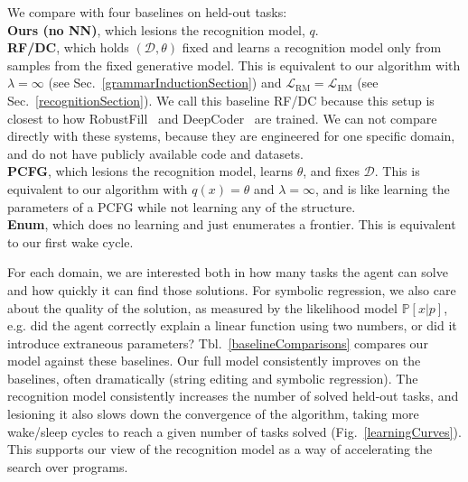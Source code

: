 \documentclass{article}
\newcommand{\probability}{\mathds{P}} %
\begin{document}
We compare  with four baselines on  held-out tasks:
\\\noindent \textbf{Ours (no NN)}, which lesions the recognition model, $q$.
\\\noindent \textbf{RF/DC}, which holds $(\mathcal{D},\theta)$ fixed and learns
a recognition model only from samples from the fixed generative model.
This is equivalent to our algorithm with $\lambda = \infty$ (see Sec.~\ref{grammarInductionSection})
and $\mathcal{L}_{\text{RM}} = \mathcal{L}_{\text{HM}}$ (see Sec.~\ref{recognitionSection}).
We call this baseline RF/DC because
this setup is closest to how RobustFill~\cite{devlin2017robustfill} and DeepCoder~\cite{balog2016deepcoder} are trained.
We can not compare directly with these systems,
because they are engineered for one specific domain, and 
do not have publicly available code and datasets.
\\\noindent \textbf{PCFG}, which lesions the recognition model, learns $\theta$, and fixes $\mathcal{D}$.
This is equivalent to our algorithm with $q(x) = \theta$ and $\lambda = \infty$,
and is like learning the parameters of a PCFG while not learning any of the structure.
\\\noindent \textbf{Enum}, which does no learning and just enumerates a frontier.
This is equivalent to our first wake cycle.

For each domain,
we are interested both in how many tasks the
agent can solve and how quickly it can find those solutions.
For symbolic regression, we also care about the quality
of the solution, as measured by the likelihood model $\probability[x|p]$,
e.g. did the agent correctly explain a linear function
using two numbers, or did it introduce extraneous parameters?
Tbl.~\ref{baselineComparisons}
compares our model against these baselines.
Our full model consistently
improves on the baselines,
often dramatically (string editing and symbolic regression).
The recognition model 
consistently increases the number of solved held-out tasks,
and lesioning it also slows down the convergence of the algorithm,
taking more wake/sleep cycles to reach a given number of tasks solved (Fig.~\ref{learningCurves}).
This supports our view of the recognition model as a way of accelerating the search over programs.
\end{document}
